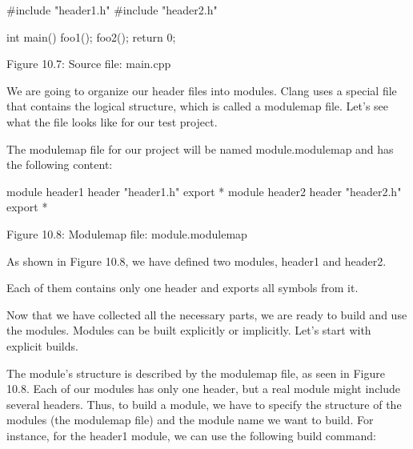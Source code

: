 \begin{cpp}
#include "header1.h"
#include "header2.h"

int main() {
  foo1();
  foo2();
  return 0;
}
\end{cpp}

\begin{center}
Figure 10.7: Source file: main.cpp
\end{center}

We are going to organize our header files into modules. Clang uses a special file that contains the logical structure, which is called a modulemap file. Let's see what the file looks like for our test project.


The modulemap file for our project will be named module.modulemap and has the following content:

\begin{cpp}
module header1 {
  header "header1.h"
  export *
}
module header2 {
  header "header2.h"
  export *
}
\end{cpp}

\begin{center}
Figure 10.8: Modulemap file: module.modulemap
\end{center}

As shown in Figure 10.8, we have defined two modules, header1 and header2.

Each of them contains only one header and exports all symbols from it.

Now that we have collected all the necessary parts, we are ready to build and use the modules. Modules can be built explicitly or implicitly. Let's start with explicit builds.


The module's structure is described by the modulemap file, as seen in Figure 10.8. Each of our modules has only one header, but a real module might include several headers. Thus, to build a module, we have to specify the structure of the modules (the modulemap file) and the module name we want to build. For instance, for the header1 module, we can use the following build command:


